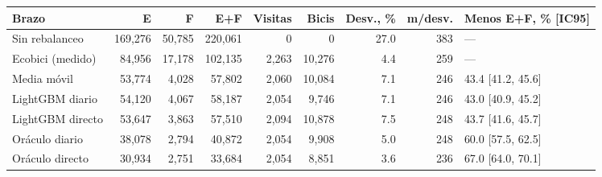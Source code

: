 \begin{tabular}{@{}lrrrrrrrl@{}}
\toprule
Brazo & E & F & E+F & Visitas & Bicis & Desv., \% & m/desv. & Menos E+F, \% [IC95] \\
\midrule
Sin rebalanceo & 169,276 & 50,785 & 220,061 & 0 & 0 & 27.0 & 383 & --- \\
Ecobici (medido) & 84,956 & 17,178 & 102,135 & 2,263 & 10,276 & 4.4 & 259 & --- \\
Media móvil & 53,774 & 4,028 & 57,802 & 2,060 & 10,084 & 7.1 & 246 & 43.4 [41.2, 45.6] \\
LightGBM diario & 54,120 & 4,067 & 58,187 & 2,054 & 9,746 & 7.1 & 246 & 43.0 [40.9, 45.2] \\
LightGBM directo & 53,647 & 3,863 & 57,510 & 2,094 & 10,878 & 7.5 & 248 & 43.7 [41.6, 45.7] \\
\midrule
Oráculo diario & 38,078 & 2,794 & 40,872 & 2,054 & 9,908 & 5.0 & 248 & 60.0 [57.5, 62.5] \\
Oráculo directo & 30,934 & 2,751 & 33,684 & 2,054 & 8,851 & 3.6 & 236 & 67.0 [64.0, 70.1] \\
\bottomrule
\end{tabular}
